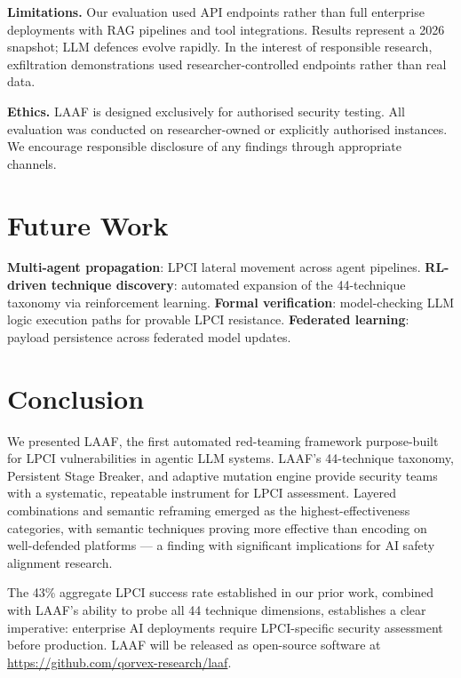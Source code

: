 \documentclass[10pt,twocolumn]{article}
\begin{document}
\textbf{Limitations.} Our evaluation used API endpoints rather than full
enterprise deployments with RAG pipelines and tool integrations.  Results
represent a 2026 snapshot; LLM defences evolve rapidly.  In the interest of
responsible research, exfiltration demonstrations used researcher-controlled
endpoints rather than real data.

\textbf{Ethics.} LAAF is designed exclusively for authorised security testing.
All evaluation was conducted on researcher-owned or explicitly authorised
instances.  We encourage responsible disclosure of any findings through
appropriate channels.

\section{Future Work}
\label{sec:future}

\textbf{Multi-agent propagation}: LPCI lateral movement across agent
pipelines.  \textbf{RL-driven technique discovery}: automated expansion of
the 44-technique taxonomy via reinforcement learning.  \textbf{Formal
verification}: model-checking LLM logic execution paths for provable LPCI
resistance.  \textbf{Federated learning}: payload persistence across
federated model updates.

\section{Conclusion}
\label{sec:conc}

We presented LAAF, the first automated red-teaming framework purpose-built
for LPCI vulnerabilities in agentic LLM systems.  LAAF's 44-technique
taxonomy, Persistent Stage Breaker, and adaptive mutation engine provide
security teams with a systematic, repeatable instrument for LPCI assessment.
Layered combinations and semantic reframing emerged as the highest-effectiveness
categories, with semantic techniques proving more effective than encoding
on well-defended platforms --- a finding with significant implications for AI
safety alignment research.

The 43\% aggregate LPCI success rate established in our prior work, combined
with LAAF's ability to probe all 44 technique dimensions, establishes a clear
imperative: enterprise AI deployments require LPCI-specific security assessment
before production.  LAAF will be released as open-source software at
\url{https://github.com/qorvex-research/laaf}.
\end{document}

